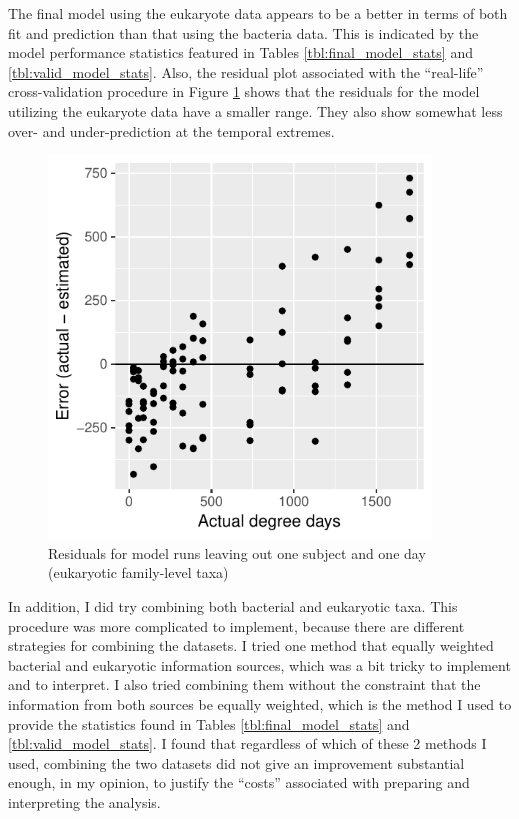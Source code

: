 \documentclass{article}
\begin{document}
The final model using the eukaryote data appears to be a better in
terms of both fit and prediction than that using the bacteria data.
This is indicated by the model performance statistics featured in
Tables \ref{tbl:final_model_stats} and \ref{tbl:valid_model_stats}.
Also, the residual plot associated with the ``real-life''
cross-validation procedure in Figure
\ref{fig:leave_one_out_resids_euk_family_taxa} shows that the
residuals for the model utilizing the eukaryote data have a smaller
range.  They also show somewhat less over- and under-prediction at the
temporal extremes.
\begin{figure}
  \centering
  \includegraphics[width=4in]{../eukaryote_data/only_families/all_time_steps/hit_1perc_twice/leave_out_one_subj_and_one_day_residuals}
  \caption{Residuals for model runs leaving out one subject and one day (eukaryotic family-level taxa)}
  \label{fig:leave_one_out_resids_euk_family_taxa}
\end{figure}

In addition, I did try combining both bacterial and eukaryotic taxa.
This procedure was more complicated to implement, because there are
different strategies for combining the datasets.  I tried one method
that equally weighted bacterial and eukaryotic information sources,
which was a bit tricky to implement and to interpret.  I also tried
combining them without the constraint that the information from both
sources be equally weighted, which is the method I used to provide the
statistics found in Tables \ref{tbl:final_model_stats} and
\ref{tbl:valid_model_stats}.  I found that regardless of which of
these 2 methods I used, combining the two datasets did not give an
improvement substantial enough, in my opinion, to justify the
``costs'' associated with preparing and interpreting the analysis.
\end{document}
